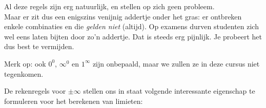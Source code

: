 \documentclass{ximera}
\begin{document}
Al deze regels zijn erg natuurlijk, en stellen op zich geen probleem. \\
Maar er zit dus een enigszins venijnig addertje onder het gras: er ontbreken enkele combinaties en die \textit{gelden niet} (altijd). Op examens durven studenten zich wel eens laten bijten door zo'n addertje. Dat is steeds erg pijnlijk. Je probeert het dus best te vermijden.

Merk op: ook $0^0$, $\infty^0$ en $1^\infty$ zijn onbepaald, maar we zullen ze in deze cursus niet tegenkomen.


De rekenregels voor $\pm\infty$ stellen ons in staat volgende interessante eigenschap te formuleren voor het berekenen van limieten:
\end{document}

